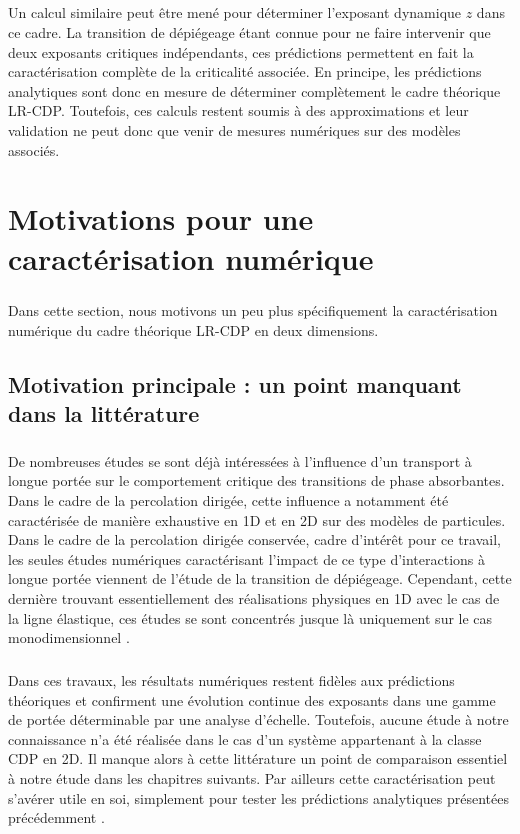 \subparagraph{}Un calcul similaire peut être mené pour déterminer l'exposant dynamique $z$ dans ce cadre. La transition de dépiégeage étant connue pour ne faire intervenir que deux exposants critiques indépendants, ces prédictions permettent en fait la caractérisation complète de la criticalité associée. En principe, les prédictions analytiques sont donc en mesure de déterminer complètement le cadre théorique LR-CDP. Toutefois, ces calculs restent soumis à des approximations et leur validation ne peut donc que venir de mesures numériques sur des modèles associés.

\section{Motivations pour une caractérisation numérique}

\subparagraph{}Dans cette section, nous motivons un peu plus spécifiquement la caractérisation numérique du cadre théorique LR-CDP en deux dimensions.

\subsection{Motivation principale : un point manquant dans la littérature}

\subparagraph{}De nombreuses études se sont déjà intéressées à l'influence d'un transport à longue portée sur le comportement critique des transitions de phase absorbantes. Dans le cadre de la percolation dirigée, cette influence a notamment été caractérisée de manière exhaustive en 1D \cite{hinrichsen_model_1999, hinrichsen_non_equilibrium_2007} et en 2D \cite{dos_santos_crossover_2018} sur des modèles de particules. Dans le cadre de la percolation dirigée conservée, cadre d'intérêt pour ce travail, les seules études numériques caractérisant l'impact de ce type d'interactions à longue portée viennent de l'étude de la transition de dépiégeage. Cependant, cette dernière trouvant essentiellement des réalisations physiques en 1D avec le cas de la ligne élastique, ces études se sont concentrés jusque là uniquement sur le cas monodimensionnel \cite{le_priol_long_range_2020, tanguy_individual_1998, rosso_roughness_2002, ramanathan_onset_1998}.

\subparagraph{}Dans ces travaux, les résultats numériques restent fidèles aux prédictions théoriques et confirment une évolution continue des exposants dans une gamme de portée déterminable par une analyse d'échelle. Toutefois, aucune étude à notre connaissance n'a été réalisée dans le cas d'un système appartenant à la classe CDP en 2D. Il manque alors à cette littérature un point de comparaison essentiel à notre étude dans les chapitres suivants. Par ailleurs cette caractérisation peut s'avérer utile en soi, simplement pour tester les prédictions analytiques présentées précédemment \cite{le_doussal_two_loop_2002}.

